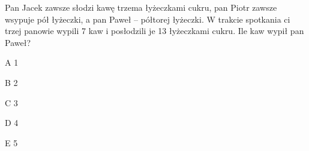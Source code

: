 \begin{tresc}
Pan Jacek zawsze słodzi kawę trzema łyżeczkami cukru, pan Piotr zawsze wsypuje pół łyżeczki, a pan Paweł – półtorej łyżeczki. W trakcie spotkania ci trzej panowie wypili 7 kaw i posłodzili je 13 łyżeczkami cukru. Ile kaw wypił pan Paweł?
\end{tresc}
\begin{wariant}{A} 1 \end{wariant}
\begin{wariant}{B} 2 \end{wariant}
\begin{wariant}{C} 3 \end{wariant}
\begin{wariant}{D} 4 \end{wariant}
\begin{wariant}{E} 5 \end{wariant}
